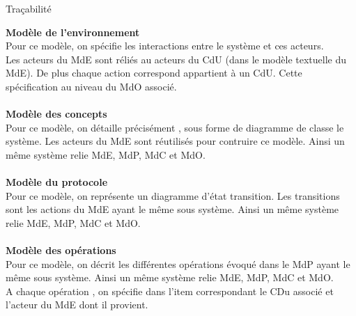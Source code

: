 \begin{LQ}{Traçabilité}


\textbf{Modèle de l'environnement}\\
Pour ce modèle, on spécifie les interactions entre le système et ces acteurs. \\
Les acteurs du MdE sont réliés au acteurs du CdU (dans le modèle textuelle du MdE). De plus chaque action correspond appartient à un CdU. Cette spécification au niveau du MdO associé.\\
\\

\textbf{Modèle des concepts}\\
Pour ce modèle, on détaille précisément , sous forme de diagramme de classe le système. Les acteurs du MdE sont réutilisés pour contruire ce modèle. Ainsi un même système relie MdE, MdP, MdC et MdO.\\
\\


\textbf{Modèle du protocole}\\
Pour ce modèle, on représente un diagramme d’état transition. Les transitions sont les actions du MdE ayant le même sous système. Ainsi un même système relie MdE, MdP, MdC et MdO.\\
\\



\textbf{Modèle des opérations}\\
Pour ce modèle, on décrit les différentes opérations évoqué dans le MdP ayant le même sous système. Ainsi un même système relie MdE, MdP, MdC et MdO.\\

A chaque opération , on spécifie dans l’item correspondant le CDu associé et l’acteur du MdE dont il provient.\\
\\

\end{LQ}
